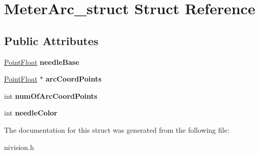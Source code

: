 \hypertarget{structMeterArc__struct}{\section{\-Meter\-Arc\-\_\-struct \-Struct \-Reference}
\label{structMeterArc__struct}
}
\subsection*{\-Public \-Attributes}
\begin{DoxyCompactItemize}
\item 
\hypertarget{structMeterArc__struct_ae984b2f84588547dd6f430137b89b68f}{\hyperlink{structPointFloat__struct}{\-Point\-Float} {\bfseries needle\-Base}}\label{structMeterArc__struct_ae984b2f84588547dd6f430137b89b68f}

\item 
\hypertarget{structMeterArc__struct_a88c9884926046eed24d5d3437ad6e3b2}{\hyperlink{structPointFloat__struct}{\-Point\-Float} $\ast$ {\bfseries arc\-Coord\-Points}}\label{structMeterArc__struct_a88c9884926046eed24d5d3437ad6e3b2}

\item 
\hypertarget{structMeterArc__struct_a4ef9a89cd7ff1db40b1302b85a6efdb3}{int {\bfseries num\-Of\-Arc\-Coord\-Points}}\label{structMeterArc__struct_a4ef9a89cd7ff1db40b1302b85a6efdb3}

\item 
\hypertarget{structMeterArc__struct_a0643dc0af10bcff3417798cd0f4c4efd}{int {\bfseries needle\-Color}}\label{structMeterArc__struct_a0643dc0af10bcff3417798cd0f4c4efd}

\end{DoxyCompactItemize}


\-The documentation for this struct was generated from the following file\-:\begin{DoxyCompactItemize}
\item 
nivision.\-h\end{DoxyCompactItemize}
